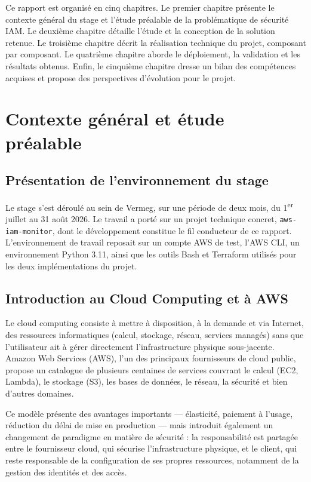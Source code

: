 \documentclass[11pt,a4paper]{report}
\begin{document}
Ce rapport est organisé en cinq chapitres. Le premier chapitre présente le contexte général du stage et l'étude préalable de la problématique de sécurité IAM. Le deuxième chapitre détaille l'étude et la conception de la solution retenue. Le troisième chapitre décrit la réalisation technique du projet, composant par composant. Le quatrième chapitre aborde le déploiement, la validation et les résultats obtenus. Enfin, le cinquième chapitre dresse un bilan des compétences acquises et propose des perspectives d'évolution pour le projet.

\chapter{Contexte général et étude préalable}

\section{Présentation de l'environnement du stage}

Le stage s'est déroulé au sein de Vermeg, sur une période de deux mois, du 1\textsuperscript{er} juillet au 31 août 2026. Le travail a porté sur un projet technique concret, \texttt{aws-iam-monitor}, dont le développement constitue le fil conducteur de ce rapport. L'environnement de travail reposait sur un compte AWS de test, l'AWS CLI, un environnement Python 3.11, ainsi que les outils Bash et Terraform utilisés pour les deux implémentations du projet.

\section{Introduction au Cloud Computing et à AWS}

Le cloud computing consiste à mettre à disposition, à la demande et via Internet, des ressources informatiques (calcul, stockage, réseau, services managés) sans que l'utilisateur ait à gérer directement l'infrastructure physique sous-jacente. Amazon Web Services (AWS), l'un des principaux fournisseurs de cloud public, propose un catalogue de plusieurs centaines de services couvrant le calcul (EC2, Lambda), le stockage (S3), les bases de données, le réseau, la sécurité et bien d'autres domaines.

Ce modèle présente des avantages importants — élasticité, paiement à l'usage, réduction du délai de mise en production — mais introduit également un changement de paradigme en matière de sécurité : la responsabilité est partagée entre le fournisseur cloud, qui sécurise l'infrastructure physique, et le client, qui reste responsable de la configuration de ses propres ressources, notamment de la gestion des identités et des accès.
\end{document}
